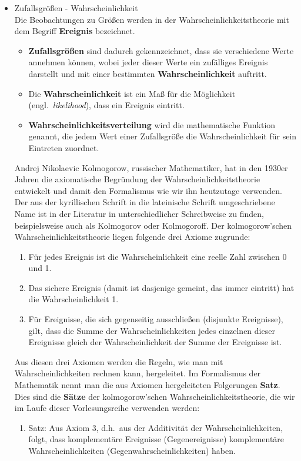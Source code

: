 \begin{raggedright}
\begin{enumerate}
\begin{itemize}
\item Zufallsgrößen - Wahrscheinlichkeit\\
Die Beobachtungen zu Größen werden in der Wahrscheinlichkeitstheorie mit dem Begriff
\textbf{Ereignis} bezeichnet.
	\begin{itemize}
	\item \textbf{Zufallsgrößen} sind dadurch gekennzeichnet, dass sie verschiedene Werte
	annehmen können, wobei jeder dieser Werte ein zufälliges Ereignis darstellt und mit einer
	bestimmten \textbf{Wahrscheinlichkeit} auftritt.
	\item Die \textbf{Wahrscheinlichkeit} ist ein Maß für die Möglichkeit (engl.\ \textsl{likelihood}),
	dass ein Ereignis eintritt.
	\item \textbf{Wahrscheinlichkeitsverteilung} wird die mathematische Funktion genannt, die jedem Wert
	einer Zufallsgröße die Wahrscheinlichkeit für sein Eintreten zuordnet.
	\end{itemize}
	Andrej Nikolaevic Kolmogorow, russischer Mathematiker, hat in den 1930er Jahren die axiomatische
	Begründung der Wahrscheinlichkeitstheorie entwickelt und damit den Formalismus wie wir ihn heutzutage
	verwenden. Der aus der kyrillischen Schrift in die lateinische Schrift umgeschriebene Name ist
	in der Literatur in unterschiedlicher Schreibweise zu finden, beispielsweise auch als Kolmogorov oder
  Kolmogoroff.
	Der kolmogorow'schen Wahrscheinlichkeitstheorie liegen folgende drei Axiome zugrunde:
	\begin{enumerate}
	\item Für jedes Ereignis ist die Wahrscheinlichkeit eine reelle Zahl zwischen 0 und 1.
	\item Das sichere Ereignis (damit ist dasjenige gemeint, das immer eintritt) hat die
		Wahrscheinlichkeit 1.
	\item Für Ereignisse, die sich gegenseitig ausschließen (disjunkte Ereignisse), gilt, dass die Summe der Wahrscheinlichkeiten
		jedes einzelnen dieser Ereignisse gleich der Wahrscheinlichkeit der Summe der Ereignisse ist.
	\end{enumerate}
	Aus diesen drei Axiomen werden die Regeln, wie man mit Wahrscheinlichkeiten rechnen kann, hergeleitet.
	Im Formalismus der Mathematik nennt man die aus Axiomen hergeleiteten Folgerungen \textbf{Satz}. Dies
	sind die \textbf{Sätze} der kolmogorow'schen Wahrscheinlichkeitstheorie, die wir im Laufe dieser
	Vorlesungsreihe verwenden werden:
	\begin{enumerate}
	\item Satz: Aus Axiom 3, d.h.\ aus der Additivität der Wahrscheinlichkeiten, folgt, dass komplementäre
		Ereignisse (Gegenereignisse) komplementäre Wahrscheinlichkeiten (Gegenwahrscheinlichkeiten) haben.


\end{enumerate}
\end{itemize}
\end{enumerate}
\end{raggedright}

